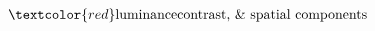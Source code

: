 \documentclass[preview]{standalone}
\begin{document}
\begin{align*}
\textcolor{red}\text{luminance} \text{contrast, \& spatial components}
\end{align*}
\end{document}
